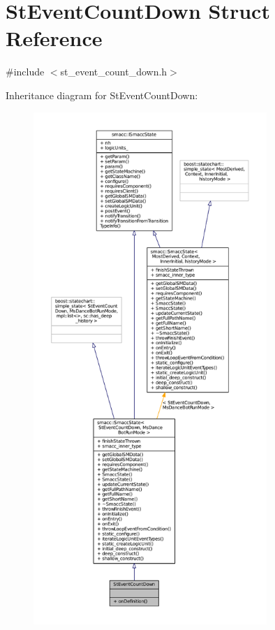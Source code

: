 \hypertarget{structStEventCountDown}{}\section{St\+Event\+Count\+Down Struct Reference}
\label{structStEventCountDown}


{\ttfamily \#include $<$st\+\_\+event\+\_\+count\+\_\+down.\+h$>$}



Inheritance diagram for St\+Event\+Count\+Down\+:
\nopagebreak
\begin{figure}[H]
\begin{center}
\leavevmode
\includegraphics[height=550pt]{structStEventCountDown__inherit__graph}
\end{center}
\end{figure}


